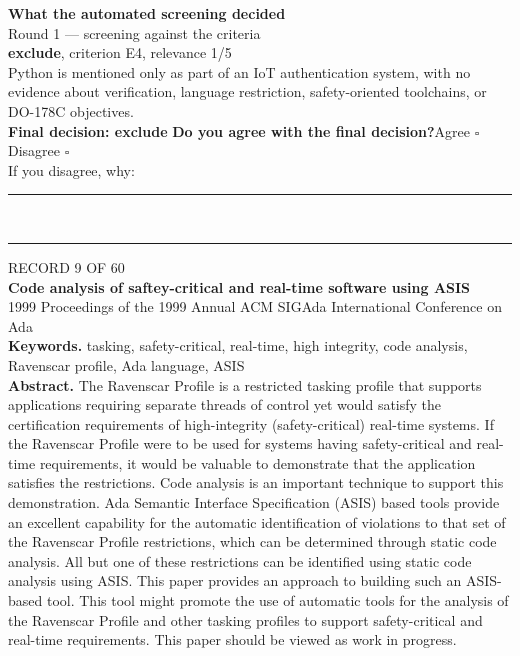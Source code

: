 \documentclass[11pt,a4paper]{article}
\begin{document}
\vspace{3mm}
\vspace{2.5mm}
{\small\textbf{What the automated screening decided}}\\[2mm]
{\footnotesize\color{soft}Round 1 --- screening against the criteria}\\[0.5mm]
{\small\textbf{exclude}, criterion E4, relevance 1/5}\\[0.5mm]
{\small Python is mentioned only as part of an IoT authentication system, with no evidence about verification, language restriction, safety-oriented toolchains, or DO-178C objectives.}\\[2.5mm]
{\small\textbf{Final decision: exclude}}
\vspace{2mm}
{\small\textbf{Do you agree with the final decision?}\quad{}Agree $\square$\qquad{}Disagree $\square$}\\[1mm]
{\footnotesize\color{soft}If you disagree, why:}\\[1mm]
\color{rule}\rule{\linewidth}{0.3pt}\\[3mm]\rule{\linewidth}{0.3pt}\color{black}
\clearpage
{\color{soft}\footnotesize RECORD 9 OF 60}\\[1mm]
{\large\bfseries Code analysis of saftey-critical and real-time software using ASIS}\\[1.5mm]
{\color{soft}\small 1999 \textperiodcentered{} Proceedings of the 1999 Annual ACM SIGAda International Conference on Ada}\\[2mm]
{\small\textbf{Keywords.} tasking, safety-critical, real-time, high integrity, code analysis, Ravenscar profile, Ada language, ASIS}\\[2mm]
{\small\textbf{Abstract.} The Ravenscar Profile is a restricted tasking profile that supports applications requiring separate threads of control yet would satisfy the certification requirements of high-integrity (safety-critical) real-time systems. If the Ravenscar Profile were to be used for systems having safety-critical and real-time requirements, it would be valuable to demonstrate that the application satisfies the restrictions. Code analysis is an important technique to support this demonstration. Ada Semantic Interface Specification (ASIS) based tools provide an excellent capability for the automatic identification of violations to that set of the Ravenscar Profile restrictions, which can be determined through static code analysis. All but one of these restrictions can be identified using static code analysis using ASIS. This paper provides an approach to building such an ASIS-based tool. This tool might promote the use of automatic tools for the analysis of the Ravenscar Profile and other tasking profiles to support safety-critical and real-time requirements. This paper should be viewed as work in progress.}
\end{document}
